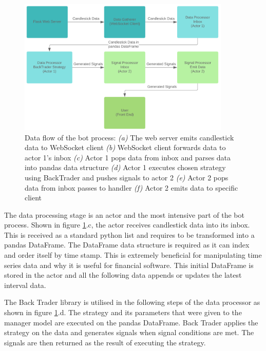 \begin{figure}[htb]
    \centering
	\includegraphics[width=0.9\textwidth]{content/graphics/diagrams/actor_dataflow.png}
	\caption{Data flow of the bot process: 
	\textit{(a)} The web server emits candlestick data to WebSocket client
	\textit{(b)} WebSocket client forwards data to actor 1's inbox
    \textit{(c)} Actor 1 pops data from inbox and parses data into pandas data structure
    \textit{(d)} Actor 1 executes chosen strategy using BackTrader and pushes signals to actor 2
    \textit{(e)} Actor 2 pops data from inbox passes to handler
    \textit{(f)} Actor 2 emits data to specific client}
    
	\label{fig:implementation:actor_dataflow}
\end{figure}

The data processing stage is an actor and the most intensive part of the bot process. Shown in figure \ref{fig:implementation:actor_dataflow}.c, the actor receives candlestick data into its inbox. This is received as a standard python list and requires to be transformed into a pandas DataFrame. The DataFrame data structure is required as it can index and order itself by time stamp. This is extremely beneficial for manipulating time series data and why it is useful for financial software. This initial DataFrame is stored in the actor and all the following data appends or updates the latest interval data. 

The Back Trader library is utilised in the following steps of the data processor as shown in figure \ref{fig:implementation:actor_dataflow}.d. The strategy and its parameters that were given to the manager model are executed on the pandas DataFrame. Back Trader applies the strategy on the data and generates signals when signal conditions are met. The signals are then returned as the result of executing the strategy.

